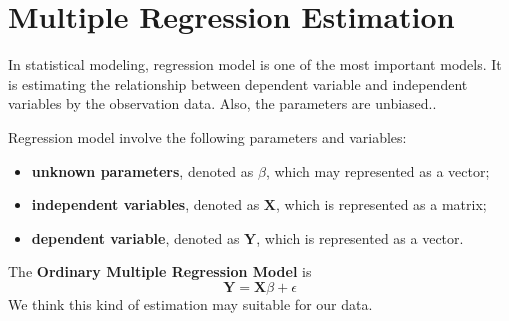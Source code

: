 \section{Multiple Regression Estimation}

In statistical modeling, regression model is one of the most important models. It is estimating the relationship between dependent variable and independent variables by the observation data. Also, the parameters are unbiased.\citep{montgomery2012introduction}.

Regression model involve the following parameters and variables:
\begin{itemize}
    \item \textbf{unknown parameters}, denoted as $\beta$, which may represented as a vector;
    \item \textbf{independent variables}, denoted as $\mathbf{X}$, which is represented as a matrix;
    \item \textbf{dependent variable}, denoted as $\mathbf{Y}$, which is represented as a vector.
\end{itemize}
The \textbf{Ordinary Multiple Regression Model} is
$$
  \mathbf{Y} = \mathbf{X} \beta + \epsilon
$$
We think this kind of estimation may suitable for our data.
